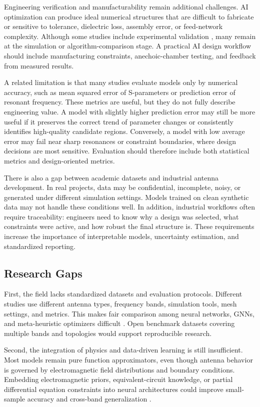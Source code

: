 \documentclass{article}
\begin{document}
Engineering verification and manufacturability remain additional challenges. AI optimization can produce ideal numerical structures that are difficult to fabricate or sensitive to tolerance, dielectric loss, assembly error, or feed-network complexity. Although some studies include experimental validation \cite{belen2023transmitarray}, many remain at the simulation or algorithm-comparison stage. A practical AI design workflow should include manufacturing constraints, anechoic-chamber testing, and feedback from measured results.

A related limitation is that many studies evaluate models only by numerical accuracy, such as mean squared error of S-parameters or prediction error of resonant frequency. These metrics are useful, but they do not fully describe engineering value. A model with slightly higher prediction error may still be more useful if it preserves the correct trend of parameter changes or consistently identifies high-quality candidate regions. Conversely, a model with low average error may fail near sharp resonances or constraint boundaries, where design decisions are most sensitive. Evaluation should therefore include both statistical metrics and design-oriented metrics.

There is also a gap between academic datasets and industrial antenna development. In real projects, data may be confidential, incomplete, noisy, or generated under different simulation settings. Models trained on clean synthetic data may not handle these conditions well. In addition, industrial workflows often require traceability: engineers need to know why a design was selected, what constraints were active, and how robust the final structure is. These requirements increase the importance of interpretable models, uncertainty estimation, and standardized reporting.

\subsection{Research Gaps}

First, the field lacks standardized datasets and evaluation protocols. Different studies use different antenna types, frequency bands, simulation tools, mesh settings, and metrics. This makes fair comparison among neural networks, GNNs, and meta-heuristic optimizers difficult \cite{sarker2023review,yang2026gphercnn}. Open benchmark datasets covering multiple bands and topologies would support reproducible research.

Second, the integration of physics and data-driven learning is still insufficient. Most models remain pure function approximators, even though antenna behavior is governed by electromagnetic field distributions and boundary conditions. Embedding electromagnetic priors, equivalent-circuit knowledge, or partial differential equation constraints into neural architectures could improve small-sample accuracy and cross-band generalization \cite{raissi2019pinn,karniadakis2021piml}.
\end{document}
